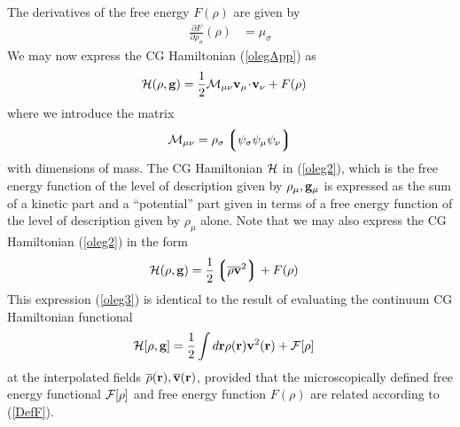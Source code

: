 \documentclass[b5paper,openright,11pt]{book}
\newcommand{\esc}{\!\cdot\!}
\newcommand{\llg}{\left\lgroup}
\newcommand{\rlg}{\right\rgroup}
\begin{document}
\begin{appendices}
The derivatives of the free energy $F(\rho)$  are given by 
\begin{align}
   \frac{\partial F}{\partial\rho_\sigma}(\rho) &=\mu_\sigma
\label{Fd2}
\end{align}
We may now express the CG Hamiltonian (\ref{olegApp}) as
\begin{align}
  {\cal H}(\rho,{\bf g}) &=  \frac{1}{2}{\cal M}_{\mu\nu}{\bf v}_\mu\esc{\bf v}_\nu
+ F(\rho)
\label{oleg2}
\end{align}
where we introduce the matrix
\begin{align}
  {\cal M}_{\mu\nu}={\rho}_\sigma\llg\psi_\sigma\psi_\mu\psi_\nu\rlg
\label{AvecalM}
\end{align}
with dimensions  of mass.  The  CG Hamiltonian ${\cal  H}$ in
(\ref{oleg2}),  which is  the free  energy  function of  the level  of
description given by $\rho_\mu,{\bf g}_\mu$ is expressed as the sum of
a  kinetic part  and a  ``potential'' part  given in  terms of  a free
energy function of the level of description given by $\rho_\mu$ alone.
Note   that  we   may   also  express   the  CG Hamiltonian (\ref{oleg2})
in the form
\begin{align}      {\cal       H}(\rho,{\bf      g})       &=
  \frac{1}{2}\llg\overline{\rho}\overline{\bf v}^2\rlg + F(\rho)
\label{oleg3}
\end{align}
This expression
(\ref{oleg3}) is identical  to the result of  evaluating the continuum
CG Hamiltonian functional
\begin{align}
  {\cal H}[\rho,{\bf g}]&=\frac{1}{2}\int d{\bf r}\rho({\bf r}){\bf v}^2({\bf r})+{\cal F}[\rho]
\end{align}
at  the  interpolated fields  $\overline{\rho}({\bf  r}),\overline{\bf
  v}({\bf r})$, provided that  the microscopically defined free energy
functional  ${\cal F}[\rho]$  and free  energy function  $F(\rho)$ are
related according to (\ref{DefF}).


\end{appendices}
\end{document}
